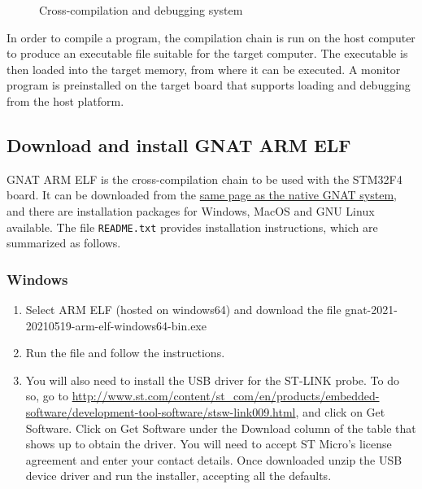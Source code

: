 \begin{figure}[hbtp!]
    \caption{Cross-compilation and debugging system}
    \label{fig:cross}
\end{figure}

In order to compile a program, the compilation chain is run on the host computer to produce an executable file suitable for the target computer.
The executable is then loaded into the target memory,
from where it can be executed.
A monitor program is preinstalled on the target board
that supports loading and debugging from the host platform.

\subsection{Download and install GNAT ARM ELF}

GNAT ARM ELF is the cross-compilation chain to be used with the STM32F4 board. It can be downloaded from the
\href{https://www.adacore.com/download/more}{same page as the native GNAT system},
and there are installation packages for Windows, MacOS and GNU Linux available.
The file \texttt{README.txt} provides installation instructions,
which are summarized as follows.

\subsubsection*{Windows}
\begin{enumerate}
\item Select ARM ELF (hosted on windows64) and download the file
gnat-2021-20210519-arm-elf-windows64-bin.exe
\item Run the file and follow the instructions.
\item You will also need to install the USB driver for the ST-LINK probe. To do so, go to \url{http://www.st.com/content/st\_com/en/products/embedded-software/development-tool-software/stsw-link009.html}, and click on Get Software. Click on Get Software under the Download column of the table that shows up to obtain the driver. You will need to accept ST Micro’s license agreement and enter your contact details. 
Once downloaded unzip the USB device driver and run the installer, accepting all the defaults.
\end{enumerate}
